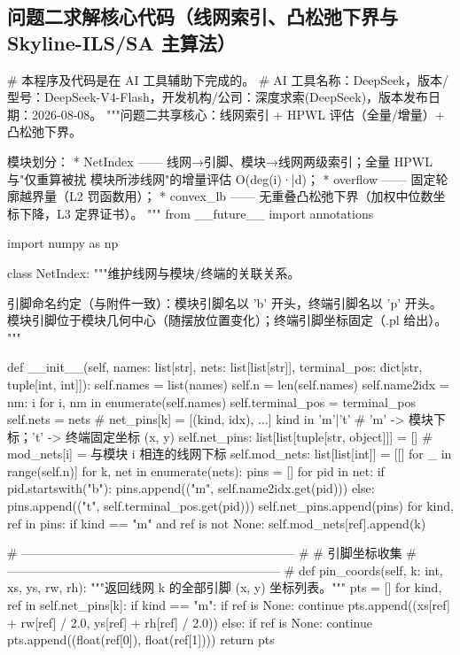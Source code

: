 \documentclass{JXUSTmodeling}
\begin{document}
\begin{appendixx}
  \section{问题二求解核心代码（线网索引、凸松弛下界与 Skyline-ILS/SA 主算法）}
  \begin{python}
# 本程序及代码是在 AI 工具辅助下完成的。
# AI 工具名称：DeepSeek，版本/型号：DeepSeek-V4-Flash，开发机构/公司：深度求索(DeepSeek)，版本发布日期：2026-08-08。
"""问题二共享核心：线网索引 + HPWL 评估（全量/增量）+ 凸松弛下界。

模块划分：
  * NetIndex     —— 线网→引脚、模块→线网两级索引；全量 HPWL 与"仅重算被扰
                    模块所涉线网"的增量评估 O(deg(i)·\bar d)；
  * overflow     —— 固定轮廓越界量（L2 罚函数用）；
  * convex_lb    —— 无重叠凸松弛下界（加权中位数坐标下降，L3 定界证书）。
"""
from __future__ import annotations

import numpy as np


class NetIndex:
    """维护线网与模块/终端的关联关系。

    引脚命名约定（与附件一致）：模块引脚名以 'b' 开头，终端引脚名以 'p' 开头。
    模块引脚位于模块几何中心（随摆放位置变化）；终端引脚坐标固定（.pl 给出）。
    """

    def __init__(self, names: list[str], nets: list[list[str]],
                 terminal_pos: dict[str, tuple[int, int]]):
        self.names = list(names)
        self.n = len(self.names)
        self.name2idx = {nm: i for i, nm in enumerate(self.names)}
        self.terminal_pos = terminal_pos
        self.nets = nets
        # net_pins[k] = [(kind, idx), ...]  kind in {'m'|'t'}
        #   'm' -> 模块下标；'t' -> 终端固定坐标 (x, y)
        self.net_pins: list[list[tuple[str, object]]] = []
        # mod_nets[i] = 与模块 i 相连的线网下标
        self.mod_nets: list[list[int]] = [[] for _ in range(self.n)]
        for k, net in enumerate(nets):
            pins = []
            for pid in net:
                if pid.startswith("b"):
                    pins.append(("m", self.name2idx.get(pid)))
                else:
                    pins.append(("t", self.terminal_pos.get(pid)))
            self.net_pins.append(pins)
            for kind, ref in pins:
                if kind == "m" and ref is not None:
                    self.mod_nets[ref].append(k)

    # ------------------------------------------------------------------ #
    # 引脚坐标收集
    # ------------------------------------------------------------------ #
    def pin_coords(self, k: int, xs, ys, rw, rh):
        """返回线网 k 的全部引脚 (x, y) 坐标列表。"""
        pts = []
        for kind, ref in self.net_pins[k]:
            if kind == "m":
                if ref is None:
                    continue
                pts.append((xs[ref] + rw[ref] / 2.0, ys[ref] + rh[ref] / 2.0))
            else:
                if ref is None:
                    continue
                pts.append((float(ref[0]), float(ref[1])))
        return pts


\end{python}
\end{appendixx}
\end{document}

